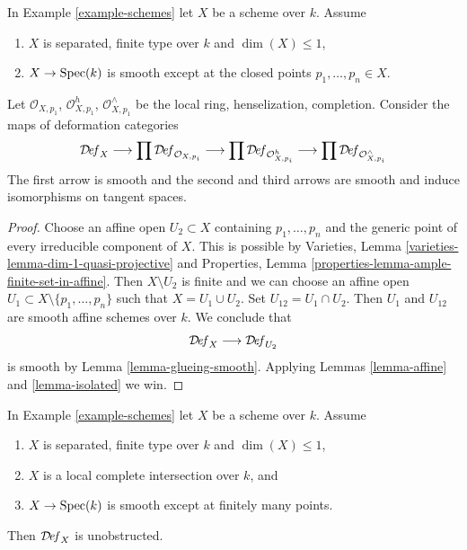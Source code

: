 \begin{lemma}
\label{lemma-curve-isolated}
In Example \ref{example-schemes} let $X$ be a scheme over $k$. Assume
\begin{enumerate}
\item $X$ is separated, finite type over $k$ and $\dim(X) \leq 1$,
\item $X \to \mathop{\mathrm{Spec}}(k)$ is smooth except at the closed
points $p_1, \ldots, p_n \in X$.
\end{enumerate}
Let $\mathcal{O}_{X, p_1}$, $\mathcal{O}_{X, p_1}^h$,
$\mathcal{O}_{X, p_1}^\wedge$ be the local ring, henselization, completion.
Consider the maps of deformation categories
$$
\mathcal{D}\!\mathit{ef}_X
\longrightarrow
\prod \mathcal{D}\!\mathit{ef}_{\mathcal{O}_{X, p_i}}
\longrightarrow
\prod \mathcal{D}\!\mathit{ef}_{\mathcal{O}_{X, p_i}^h}
\longrightarrow
\prod \mathcal{D}\!\mathit{ef}_{\mathcal{O}_{X, p_i}^\wedge}
$$
The first arrow is smooth and the second and third arrows
are smooth and induce isomorphisms on tangent spaces.
\end{lemma}

\begin{proof}
Choose an affine open $U_2 \subset X$ containing
$p_1, \ldots, p_n$ and the generic point of every irreducible
component of $X$. This is possible by
Varieties, Lemma \ref{varieties-lemma-dim-1-quasi-projective}
and Properties, Lemma \ref{properties-lemma-ample-finite-set-in-affine}.
Then $X \setminus U_2$ is finite and we can choose an affine open
$U_1 \subset X \setminus \{p_1, \ldots, p_n\}$ such that
$X = U_1 \cup U_2$. Set $U_{12} = U_1 \cap U_2$.
Then $U_1$ and $U_{12}$ are smooth affine schemes over $k$.
We conclude that
$$
\mathcal{D}\!\mathit{ef}_X \longrightarrow \mathcal{D}\!\mathit{ef}_{U_2}
$$
is smooth by Lemma \ref{lemma-glueing-smooth}.
Applying Lemmas \ref{lemma-affine} and \ref{lemma-isolated} we win.
\end{proof}

\begin{lemma}
\label{lemma-curve-isolated-lci}
In Example \ref{example-schemes} let $X$ be a scheme over $k$. Assume
\begin{enumerate}
\item $X$ is separated, finite type over $k$ and $\dim(X) \leq 1$,
\item $X$ is a local complete intersection over $k$, and
\item $X \to \mathop{\mathrm{Spec}}(k)$ is smooth except at finitely many points.
\end{enumerate}
Then $\mathcal{D}\!\mathit{ef}_X$ is unobstructed.
\end{lemma}

